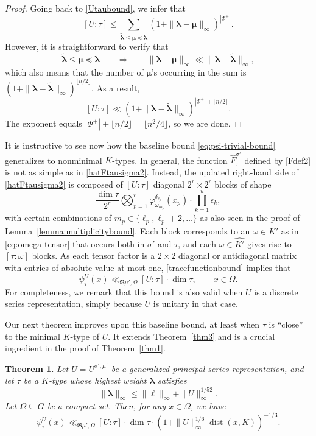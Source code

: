 \documentclass[11pt,oneside]{amsart}
\numberwithin{equation}{section}
\theoremstyle{remark}
\theoremstyle{plain}
\newtheorem{theorem}{Theorem}
\DeclareMathOperator{\dist}{dist}
\renewcommand\leq{\leqslant}
\begin{document}
\begin{proof}
Going back to \eqref{Utaubound}, we infer that
\[[U:\tau]\leq\sum_{\tilde{\bm\lambda}\leq\bm\mu\preceq\bm\lambda}(1+\|\bm\lambda-\bm\mu\|_\infty)^{|\Phi^+|}.\]
However, it is straightforward to verify that
\[\tilde{\bm\lambda}\leq\bm\mu\preceq\bm\lambda
\qquad\Longrightarrow\qquad
\|\bm\lambda-\bm\mu\|_\infty\ll\|\bm\lambda-\tilde{\bm\lambda}\|_\infty,\]
which also means that the number of $\bm\mu$'s occurring in the sum is 
$(1+\|\bm\lambda-\tilde{\bm\lambda}\|_\infty)^{\lfloor n/2\rfloor}$. As a result,
\[[U:\tau]\ll(1+\|\bm\lambda-\tilde{\bm\lambda}\|_\infty)^{|\Phi^+|+\lfloor n/2\rfloor}.\]
The exponent equals $|\Phi^+|+\lfloor n/2\rfloor=\lfloor n^2/4\rfloor$, so we are done.
\end{proof}

It is instructive to see now how the baseline bound \eqref{eq:psi-trivial-bound} generalizes to nonminimal $K$-types. In general, the function $\hat F_\tau^{\sigma'}$ defined by \eqref{Fdef2} is not as simple as in \eqref{hatFtausigma2}. Instead, the updated right-hand side of \eqref{hatFtausigma2} is composed of $[U:\tau]$ diagonal $2^r\times 2^r$ blocks of shape
\begin{equation}\label{superblocks-eq}
\frac{\dim\tau}{2^r}\bigotimes_{p=1}^r \varphi_{\omega_{m_p}}^{\delta_{\ell_p}} (x_p) \cdot \prod_{k=1}^u \epsilon_k,
\end{equation}
with certain combinations of $m_p\in\{\ell_p,\ell_p+2,\dotsc\}$ as also seen in the proof of Lemma~\ref{lemma:multiplicitybound}. Each block corresponds to an $\omega\in\widehat{K'}$ as in \eqref{eq:omega-tensor} that occurs both in $\sigma'$ and $\tau$, and each $\omega\in\widehat{K'}$ gives rise to $[\tau:\omega]$ blocks. As each tensor factor is a $2\times 2$ diagonal or antidiagonal matrix with entries of absolute value at most one, \eqref{tracefunctionbound} implies that
\begin{equation}\label{eq:psi-baseline-bound}
\psi^{U}_{\tau}(x) \ll_{\Re\mu',\Omega} [U:\tau]\cdot\dim \tau,\qquad x\in\Omega.
\end{equation}
For completeness, we remark that this bound is also valid when $U$ is a discrete series representation, simply because $U$ is unitary in that case.

Our next theorem improves upon this baseline bound, at least when $\tau$ is ``close'' to the minimal $K$-type of $U$. It extends Theorem~\ref{thm3} and is a crucial ingredient in the proof of Theorem~\ref{thm1}.

\begin{theorem}\label{thm3b} Let $U=U^{\sigma',\mu'}$ be a generalized principal series representation, and let $\tau$ be a $K$-type whose highest weight $\bm\lambda$ satisfies
\[\|\bm\lambda\|_\infty\leq\|\bm\ell\|_\infty+\|U\|_\infty^{1/52}.\]
Let $\Omega\subseteq G$ be a compact set. Then, for any $x\in\Omega$, we have
\[\psi^{U}_{\tau}(x)\ll_{\Re\mu',\Omega}[U:\tau]\cdot\dim \tau\cdot\left(1 +\|U\|_{\infty}^{1/6}\dist(x, K)\right)^{-1/3}.\]
\end{theorem}
\end{document}
